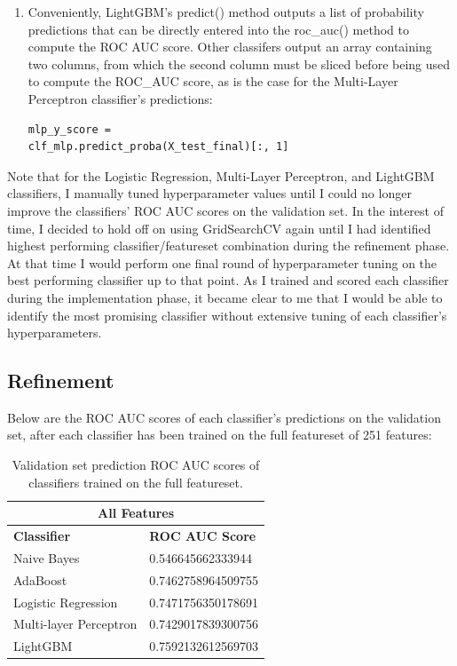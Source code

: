 \documentclass[12pt, letterpaper]{article}
\begin{document}
\begin{enumerate}
\begin{enumerate}
      \item Conveniently, LightGBM's predict() method outputs a list of probability predictions that can be directly entered into the roc_auc() method to compute the ROC AUC score. Other classifers output an array containing two columns, from which the second column must be sliced before being used to compute the ROC_AUC score, as is the case for the Multi-Layer Perceptron classifier's predictions:
      \begin{lstlisting}
mlp_y_score =
clf_mlp.predict_proba(X_test_final)[:, 1]
      \end{lstlisting}
    \end{enumerate}
  \end{enumerate}
  Note that for the Logistic Regression, Multi-Layer Perceptron, and LightGBM classifiers, I manually tuned hyperparameter values until I could no longer improve the classifiers' ROC AUC scores on the validation set. In the interest of time, I decided to hold off on using GridSearchCV again until I had identified highest performing classifier/featureset combination during the refinement phase. At that time I would perform one final round of hyperparameter tuning on the best performing classifier up to that point. As I trained and scored each classifier during the implementation phase, it became clear to me that I would be able to identify the most promising classifier without extensive tuning of each classifier's hyperparameters.

\subsection{Refinement}
Below are the ROC AUC scores of each classifier's predictions on the validation set, after each classifier has been trained on the full featureset of 251 features:

\begin{table}[ht]
  \centering
  {
  \begin{tabular}{|| l | l ||}
   \hline
   \multicolumn{2}{|c|}{All Features} \\
   \hline
   \rowcolor{white} \textbf{Classifier} & \textbf{ROC AUC Score} \\ [0.5ex]
   \hline\hline
   Naive Bayes & 0.546645662333944 \\
   \hline
   AdaBoost & 0.7462758964509755 \\
   \hline
   Logistic Regression & 0.7471756350178691 \\
   \hline
   Multi-layer Perceptron & 0.7429017839300756 \\
   \hline
   LightGBM & 0.7592132612569703 \\ [1ex]
   \hline
  \end{tabular}
 }
 \caption{Validation set prediction ROC AUC scores of classifiers trained on the full featureset.}
 \label{table:1}
\end{table}
\end{document}

